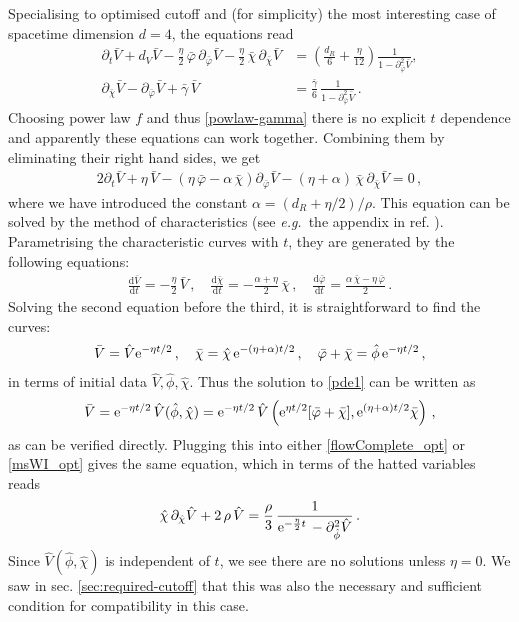 \documentclass[11pt,draft]{book} %
\newcommand\eg{\textit{e.g.}\ }
\newcommand{\bp}{\bar \varphi}
\newcommand{\bc}{\bar \chi}
\newcommand{\bV}{\bar V}
\newcommand{\hV}{\hat V}
\newcommand{\hp}{\hat \phi}
\newcommand{\hc}{\hat \chi}
\begin{document}
Specialising to optimised cutoff and (for simplicity) the most interesting case of spacetime dimension $d=4$,
the equations read
\begin{align}
  \label{flowComplete_opt}
  \partial_t\bar{V}+
  d_V \bar V - \frac{\eta}{2} \, \bar \varphi \, \partial_{\bar\varphi}\bar V -\frac{\eta}{2} \, \bar \chi \, \partial_{\bar\chi}\bar V &= \left(  \frac{d_R}{6} + \frac{\eta}{12} \right) \frac{1}{1 -  \partial^2_{\bar\varphi}\bar V},\\
  \label{msWI_opt}
  \partial_{\bar\chi}\bar V - \partial_{\bar\varphi}\bar V + \bar{\gamma} \, \bar V &= \frac{\bar{\gamma}}{6} \, \frac{1}{1 - \partial^2_{\bar\varphi}\bar V}\,.
\end{align}
Choosing power law $f$ and thus \eqref{powlaw-gamma} there is no explicit $t$ dependence and apparently
these equations can work together. Combining them by eliminating their right hand sides, we get
\begin{align}
  \label{pde1}
  2\partial_t\bar{V}+\eta \, \bar{V}-\left(\eta \, \bar\varphi-\alpha \, \bc\right)\partial_{\bar{\varphi}}\bar{V}-(\eta+\alpha) \, \bar\chi \, \partial_{\bar{\chi}} \bar{V}=0\,,
\end{align}
where we have introduced the constant $\alpha = (d_R+\eta/2)/\rho$.
This equation can be solved by the method of characteristics
(see \eg the appendix in ref. \cite{Dietz:2015owa}). Parametrising the characteristic curves with $t$, they are generated by the following equations:
\begin{align}
  \frac{\mathrm d\bV}{\mathrm dt} = -\frac{\eta}{2} \, \bV\,,
  \quad
  \frac{\mathrm d\bc}{\mathrm dt}=-\frac{\alpha+\eta}{2} \, \bc\,,
  \quad
  \frac{\mathrm d\bp}{\mathrm dt}=\frac{\alpha\,\bc-\eta\,\bp}{2}\,.
\end{align}
Solving the second equation before the third, it is straightforward to find the curves:
\begin{align}
  \bV = \hV {\rm e}^{-\eta t/2}\,,\quad \bc = \hc\, {\rm e}^{-(\eta+\alpha)t/2}\,,\quad \bp+\bc = \hp\, {\rm e}^{-\eta t/2}\,,
\end{align}
in terms of initial data $\hV,\hp,\hc$.
Thus the solution to \eqref{pde1} can be written as
\begin{align}
  \bV ={\rm e}^{-\eta t/2}\, \hV(\hp,\hc) ={\rm e}^{-\eta t/2} \,\hV\left({\rm e}^{\eta t/2}[\bp+\bc],{\rm e}^{(\eta+\alpha)t/2}\bc\right)\,,
\end{align}
as can be verified directly. Plugging this into either \eqref{flowComplete_opt} or \eqref{msWI_opt}
gives the same equation, which in terms of the hatted variables reads
\begin{align}
  \hc \, \partial_{\hc}\hV + 2 \, \rho \, \hV = \frac{\rho}{3} \, \frac{1}{{\rm e}^{-\frac{\eta}{2} t} \,-\partial^2_{\hp}\hV}\,.
\end{align}
Since $\hV(\hp,\hc)$ is independent of $t$, we see there are no solutions unless $\eta=0$.
We saw in sec. \ref{sec:required-cutoff} that this was also the necessary and sufficient condition for
compatibility in this case.
\end{document}

